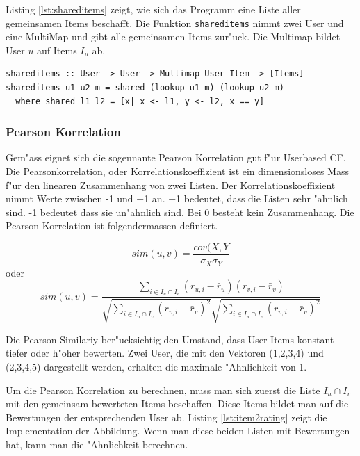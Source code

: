 \documentclass[a4paper, 12pt]{article}
\begin{document}
Listing \ref{lst:shareditems} zeigt, wie sich das Programm eine Liste aller gemeinsamen Items beschafft. Die Funktion \verb|shareditems| nimmt zwei User und eine MultiMap und gibt alle gemeinsamen Items zur"uck. Die Multimap bildet User $u$ auf Items $I_u$ ab.

\begin{lstlisting}[caption=Implementation von shareditems, label=lst:shareditems]
shareditems :: User -> User -> Multimap User Item -> [Items]
shareditems u1 u2 m = shared (lookup u1 m) (lookup u2 m)
  where shared l1 l2 = [x| x <- l1, y <- l2, x == y]
\end{lstlisting}

\subsubsection{Pearson Korrelation}
\label{sec:pearsoncorrelation}

Gem"ass \cite{jannach11} eignet sich die sogennante Pearson Korrelation gut f"ur Userbased CF. Die Pearsonkorrelation, oder Korrelationskoeffizient ist ein dimensionsloses Mass f"ur den linearen Zusammenhang von zwei Listen. Der Korrelationskoeffizient nimmt Werte zwischen -1 und +1 an. +1 bedeutet, dass die Listen sehr "ahnlich sind. -1 bedeutet dass sie un"ahnlich sind. Bei 0 besteht kein Zusammenhang. Die Pearson Korrelation ist folgendermassen definiert.

\begin{equation}
\label{eq:pearson1}
 sim(u,v) = \frac{cov(X,Y}{\sigma_X \sigma_Y} 
\end{equation}
oder
\begin{equation}
  \label{eq:pearson}
  sim(u,v)  = \frac{\sum_{i \in I_u \cap I_v}(r_{u,i} - \bar{r}_u)(r_{v,i} - \bar{r}_v)}{\sqrt{\sum_{i \in I_u \cap I_v}( r_{v,i} - \bar{r}_v)^2}\sqrt{\sum_{i \in I_u \cap I_v}( r_{v,i} - \bar{r}_v)^2}}
\end{equation}

Die Pearson Similariy ber"ucksichtig den Umstand, dass User Items konstant tiefer oder h"oher bewerten. Zwei User, die mit den Vektoren (1,2,3,4) und (2,3,4,5) dargestellt werden, erhalten die maximale "Ahnlichkeit von 1.

Um die Pearson Korrelation zu berechnen, muss man sich zuerst die Liste $I_u \cap I_v$ mit den gemeinsam bewerteten Items beschaffen. Diese Items bildet man auf die Bewertungen der entsprechenden User ab. Listing \ref{lst:item2rating} zeigt die Implementation der Abbildung. Wenn man diese beiden Listen mit Bewertungen hat, kann man die "Ahnlichkeit berechnen.
\end{document}
